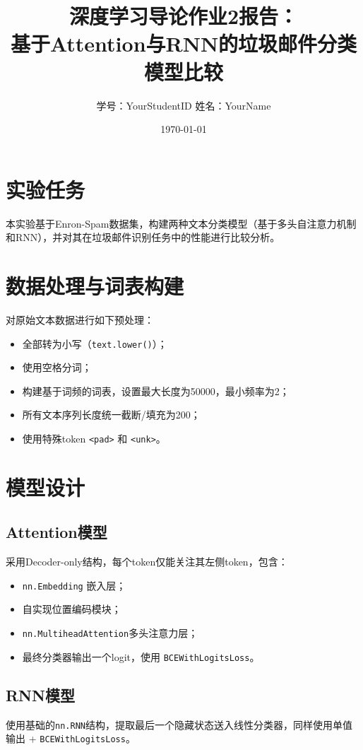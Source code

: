 \documentclass[11pt]{article}
\title{\textbf{深度学习导论作业2报告：\\
基于Attention与RNN的垃圾邮件分类模型比较}}
\author{学号：YourStudentID \quad 姓名：YourName}
\date{\today}
\begin{document}
\maketitle

\section{实验任务}
本实验基于Enron-Spam数据集，构建两种文本分类模型（基于多头自注意力机制和RNN），并对其在垃圾邮件识别任务中的性能进行比较分析。

\section{数据处理与词表构建}
对原始文本数据进行如下预处理：
\begin{itemize}
    \item 全部转为小写（\texttt{text.lower()}）；
    \item 使用空格分词；
    \item 构建基于词频的词表，设置最大长度为50000，最小频率为2；
    \item 所有文本序列长度统一截断/填充为200；
    \item 使用特殊token \texttt{<pad>} 和 \texttt{<unk>}。
\end{itemize}

\section{模型设计}
\subsection{Attention模型}
采用Decoder-only结构，每个token仅能关注其左侧token，包含：
\begin{itemize}
    \item \texttt{nn.Embedding} 嵌入层；
    \item 自实现位置编码模块；
    \item \texttt{nn.MultiheadAttention}多头注意力层；
    \item 最终分类器输出一个logit，使用 \texttt{BCEWithLogitsLoss}。
\end{itemize}

\subsection{RNN模型}
使用基础的\texttt{nn.RNN}结构，提取最后一个隐藏状态送入线性分类器，同样使用单值输出 + \texttt{BCEWithLogitsLoss}。
\end{document}
